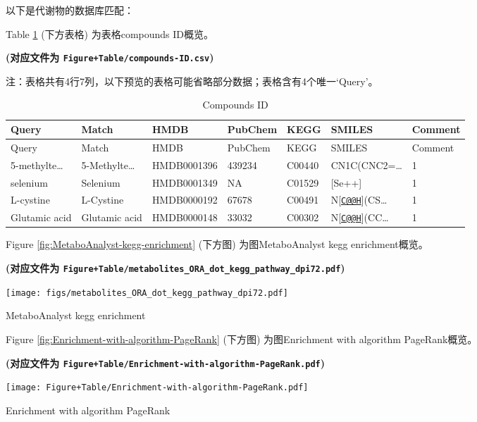 \documentclass[
]{article}
\begin{document}
以下是代谢物的数据库匹配：

Table \ref{tab:compounds-ID} (下方表格) 为表格compounds ID概览。

\textbf{(对应文件为 \texttt{Figure+Table/compounds-ID.csv})}

\begin{center}\begin{tcolorbox}[colback=gray!10, colframe=gray!50, width=0.9\linewidth, arc=1mm, boxrule=0.5pt]注：表格共有4行7列，以下预览的表格可能省略部分数据；表格含有4个唯一`Query'。
\end{tcolorbox}
\end{center}

\begin{longtable}[]{@{}lllllll@{}}
\caption{\label{tab:compounds-ID}Compounds ID}\tabularnewline
\toprule
Query & Match & HMDB & PubChem & KEGG & SMILES & Comment\tabularnewline
\midrule
\endfirsthead
\toprule
Query & Match & HMDB & PubChem & KEGG & SMILES & Comment\tabularnewline
\midrule
\endhead
5-methylte\ldots{} & 5-Methylte\ldots{} & HMDB0001396 & 439234 & C00440 & CN1C(CNC2=\ldots{} & 1\tabularnewline
selenium & Selenium & HMDB0001349 & NA & C01529 & {[}Se++{]} & 1\tabularnewline
L-cystine & L-Cystine & HMDB0000192 & 67678 & C00491 & N{[}\href{mailto:C@@H}{\nolinkurl{C@@H}}{]}(CS\ldots{} & 1\tabularnewline
Glutamic acid & Glutamic acid & HMDB0000148 & 33032 & C00302 & N{[}\href{mailto:C@@H}{\nolinkurl{C@@H}}{]}(CC\ldots{} & 1\tabularnewline
\bottomrule
\end{longtable}

Figure \ref{fig:MetaboAnalyst-kegg-enrichment} (下方图) 为图MetaboAnalyst kegg enrichment概览。

\textbf{(对应文件为 \texttt{Figure+Table/metabolites\_ORA\_dot\_kegg\_pathway\_dpi72.pdf})}

\def\@captype{figure}
\begin{center}
\texttt{[image: figs/metabolites\_ORA\_dot\_kegg\_pathway\_dpi72.pdf]}
\caption{MetaboAnalyst kegg enrichment}\label{fig:MetaboAnalyst-kegg-enrichment}
\end{center}

Figure \ref{fig:Enrichment-with-algorithm-PageRank} (下方图) 为图Enrichment with algorithm PageRank概览。

\textbf{(对应文件为 \texttt{Figure+Table/Enrichment-with-algorithm-PageRank.pdf})}

\def\@captype{figure}
\begin{center}
\texttt{[image: Figure+Table/Enrichment-with-algorithm-PageRank.pdf]}
\caption{Enrichment with algorithm PageRank}\label{fig:Enrichment-with-algorithm-PageRank}
\end{center}
\end{document}
